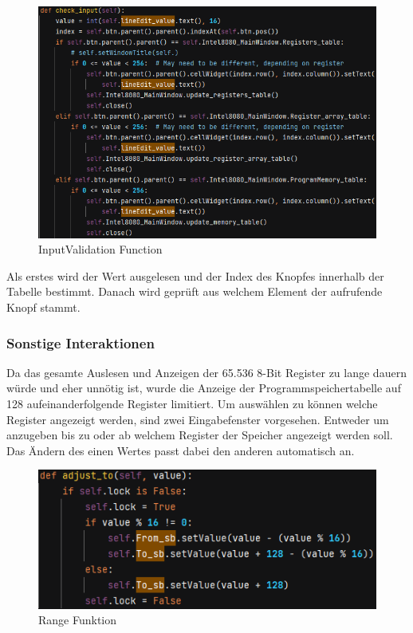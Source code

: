 \documentclass[12pt]{article}
\newcommand{\imgSpaceBefore}{\vspace{10pt}}
\begin{document}
\begin{figure}[H]
\centering
\includegraphics[width=12cm]{bilder/CheckInput}
\caption{InputValidation Function}
\label{fig:CheckInput}
\end{figure}

\noindent
Als erstes wird der Wert ausgelesen und der Index des Knopfes innerhalb der Tabelle bestimmt. Danach wird geprüft aus welchem Element der aufrufende Knopf stammt.

\subsubsection{Sonstige Interaktionen}
Da das gesamte Auslesen und Anzeigen der 65.536 8-Bit Register zu lange dauern würde und eher unnötig ist, wurde die Anzeige der Programmspeichertabelle auf 128 aufeinanderfolgende Register limitiert. Um auswählen zu können welche Register angezeigt werden, sind zwei Eingabefenster vorgesehen. Entweder um anzugeben bis zu oder ab welchem Register der Speicher angezeigt werden soll. Das Ändern des einen Wertes passt dabei den anderen automatisch an.\imgSpaceBefore

\begin{figure}[H]
\centering
\includegraphics[width=12cm]{bilder/Range_to}
\caption{Range Funktion}
\label{fig:RangeTo}
\end{figure}
\end{document}
